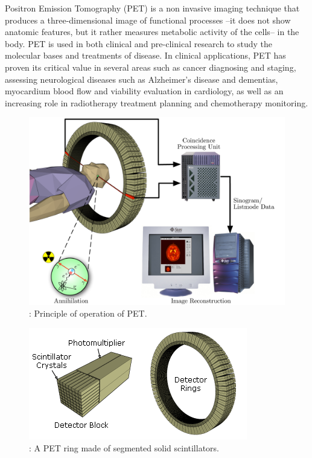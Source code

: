 \documentclass[review]{elsarticle}
\begin{document}
Positron Emission Tomography (PET) is a non invasive imaging technique that produces a three-dimensional image of functional processes --it does not show anatomic features, but it rather  measures metabolic activity of the cells-- in the body. PET is used in
both clinical and pre-clinical research to study the molecular bases and treatments of
disease. In clinical applications, PET has proven its critical value in several areas such as
cancer diagnosing and staging, assessing neurological diseases such as Alzheimer's disease
and dementias, myocardium blood flow and viability evaluation in cardiology, as well as an
increasing role in radiotherapy treatment planning and chemotherapy monitoring. 

\begin{figure}[!htb]
	\centering
	\includegraphics[scale=0.3]{../img/PET-schema.png}
	\caption{\label{fig.pet}: Principle of operation of PET. }
\end{figure}

\begin{figure}[!htb]
	\centering
	\includegraphics[scale=1.0]{../img/PET-detectorsystem_2.png}
	\caption{\label{fig.det}: A PET ring made of segmented solid scintillators. }
\end{figure}
\end{document}
